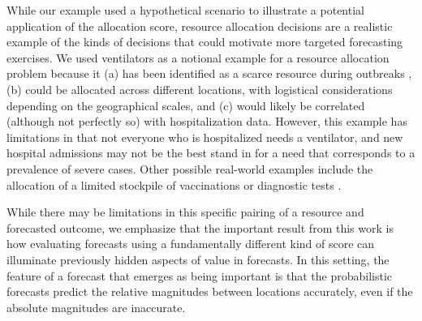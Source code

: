 \documentclass{article}\usepackage[]{graphicx}\usepackage[]{xcolor}
\begin{document}
While our example used a hypothetical scenario to illustrate a potential application of the allocation score, resource
allocation decisions are a realistic example of the kinds of decisions that could motivate more targeted forecasting
exercises.
We used ventilators as a notional example for a resource allocation problem because it (a) has been identified as a
scarce resource during outbreaks \citep{huang_stockpiling_2017}, (b) could be allocated across different locations, with
logistical considerations depending on the geographical scales, and (c) would likely be correlated (although not
perfectly so) with hospitalization data. However, this example has limitations in that not everyone who is hospitalized
needs a ventilator, and new hospital admissions may not be the best stand in for a need that corresponds to a prevalence
of severe cases. Other possible real-world examples include the allocation of a limited stockpile of vaccinations
\citep{araz_geographic_2012,persad_fair_2023} or diagnostic tests \citep{du_optimal_2022,pasco_covid-19_2023}.

While
there may be limitations in this specific pairing of a resource and forecasted outcome, we emphasize that the important
result from this work is how evaluating forecasts using a fundamentally different kind of score can illuminate
previously hidden aspects of value in forecasts. In this setting, the feature of a forecast that emerges as being
important is that the probabilistic forecasts predict the relative magnitudes between locations accurately, even if the
absolute magnitudes are inaccurate.
\end{document}
